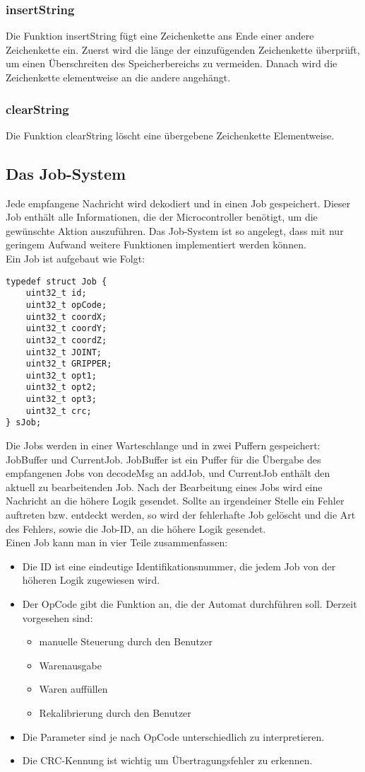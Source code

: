 \documentclass{scrartcl}
\begin{document}
\subsubsection{insertString}
Die Funktion insertString fügt eine Zeichenkette ans Ende einer andere Zeichenkette ein. Zuerst wird die länge der einzufügenden Zeichenkette überprüft, um einen Überschreiten des Speicherbereichs zu vermeiden. Danach wird die Zeichenkette elementweise an die andere angehängt.

\subsubsection{clearString}
Die Funktion clearString löscht eine übergebene Zeichenkette Elementweise.

\subsection{Das Job-System}
Jede empfangene Nachricht wird dekodiert und in einen Job gespeichert. Dieser Job enthält alle Informationen, die der Microcontroller benötigt, um die gewünschte Aktion auszuführen. Das Job-System ist so angelegt, dass mit nur geringem Aufwand weitere Funktionen implementiert werden können.\\
Ein Job ist aufgebaut wie Folgt:
\begin{verbatim}
typedef struct Job {
	uint32_t id;
	uint32_t opCode;
	uint32_t coordX;
	uint32_t coordY;
	uint32_t coordZ;
	uint32_t JOINT;
	uint32_t GRIPPER;
	uint32_t opt1;
	uint32_t opt2;
	uint32_t opt3;
	uint32_t crc;
} sJob;
\end{verbatim}
Die Jobs werden in einer Warteschlange und in zwei Puffern gespeichert:  JobBuffer und CurrentJob. JobBuffer ist ein Puffer für die Übergabe des empfangenen Jobs von decodeMsg an addJob, und CurrentJob enthält den aktuell zu bearbeitenden Job. Nach der Bearbeitung eines Jobs wird eine Nachricht an die höhere Logik gesendet. Sollte an irgendeiner Stelle ein Fehler auftreten bzw. entdeckt werden, so wird der fehlerhafte Job gelöscht und die Art des Fehlers, sowie die Job-ID, an die höhere Logik gesendet.\\
Einen Job kann man in vier Teile zusammenfassen: 
\begin{itemize}
\item Die ID ist eine eindeutige Identifikationsnummer, die jedem Job von der höheren Logik zugewiesen wird.
\item Der OpCode gibt die Funktion an, die der Automat durchführen soll. Derzeit vorgesehen sind:
\begin{itemize}
\item manuelle Steuerung durch den Benutzer
\item Warenausgabe
\item Waren auffüllen
\item Rekalibrierung durch den Benutzer
\end{itemize}
\item Die Parameter sind je nach OpCode unterschiedlich zu interpretieren.
\item Die CRC-Kennung ist wichtig um Übertragungsfehler zu erkennen.
\end{itemize}
\end{document}
